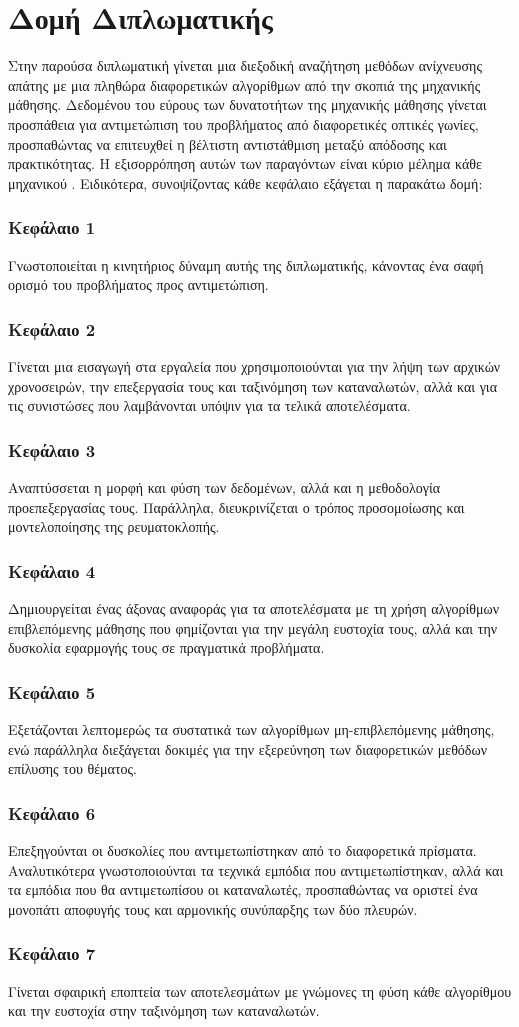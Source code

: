 \section{Δομή Διπλωματικής}
Στην παρούσα διπλωματική γίνεται μια διεξοδική αναζήτηση μεθόδων ανίχνευσης απάτης με μια πληθώρα διαφορετικών αλγορίθμων από την σκοπιά της μηχανικής μάθησης. Δεδομένου του εύρους των δυνατοτήτων της μηχανικής μάθησης γίνεται προσπάθεια για αντιμετώπιση του προβλήματος από διαφορετικές οπτικές γωνίες, προσπαθώντας να επιτευχθεί η βέλτιστη αντιστάθμιση μεταξύ απόδοσης και πρακτικότητας. Η εξισορρόπηση αυτών των παραγόντων είναι κύριο μέλημα κάθε μηχανικού \cite{artoftradeoff}. Ειδικότερα, συνοψίζοντας κάθε κεφάλαιο εξάγεται η παρακάτω δομή:
\subsubsection{Κεφάλαιο 1}
Γνωστοποιείται η κινητήριος δύναμη αυτής της διπλωματικής, κάνοντας ένα σαφή ορισμό του προβλήματος προς αντιμετώπιση.
\subsubsection{Κεφάλαιο 2}
Γίνεται μια εισαγωγή στα εργαλεία που χρησιμοποιούνται για την λήψη των αρχικών χρονοσειρών, την επεξεργασία τους και ταξινόμηση των καταναλωτών, αλλά και για τις συνιστώσες που λαμβάνονται υπόψιν για τα τελικά αποτελέσματα.
\subsubsection{Κεφάλαιο 3}
Αναπτύσσεται η μορφή και φύση των δεδομένων, αλλά και η μεθοδολογία προεπεξεργασίας τους. Παράλληλα, διευκρινίζεται ο τρόπος προσομοίωσης και μοντελοποίησης της ρευματοκλοπής.
\subsubsection{Κεφάλαιο 4}
Δημιουργείται ένας άξονας αναφοράς για τα αποτελέσματα με τη χρήση αλγορίθμων επιβλεπόμενης μάθησης που φημίζονται για την μεγάλη ευστοχία τους, αλλά και την δυσκολία εφαρμογής τους σε πραγματικά προβλήματα.
\subsubsection{Κεφάλαιο 5}
Εξετάζονται λεπτομερώς τα συστατικά των αλγορίθμων μη-επιβλεπόμενης μάθησης, ενώ παράλληλα διεξάγεται δοκιμές για την εξερεύνηση των διαφορετικών μεθόδων επίλυσης του θέματος.
\subsubsection{Κεφάλαιο 6}
Επεξηγούνται οι δυσκολίες που αντιμετωπίστηκαν από το διαφορετικά πρίσματα. Αναλυτικότερα γνωστοποιούνται τα τεχνικά εμπόδια που αντιμετωπίστηκαν, αλλά και τα εμπόδια που θα αντιμετωπίσου οι καταναλωτές, προσπαθώντας να οριστεί ένα μονοπάτι αποφυγής τους και αρμονικής συνύπαρξης των δύο πλευρών.
\subsubsection{Κεφάλαιο 7}
Γίνεται σφαιρική εποπτεία των αποτελεσμάτων με γνώμονες τη φύση κάθε αλγορίθμου και την ευστοχία στην ταξινόμηση των καταναλωτών.